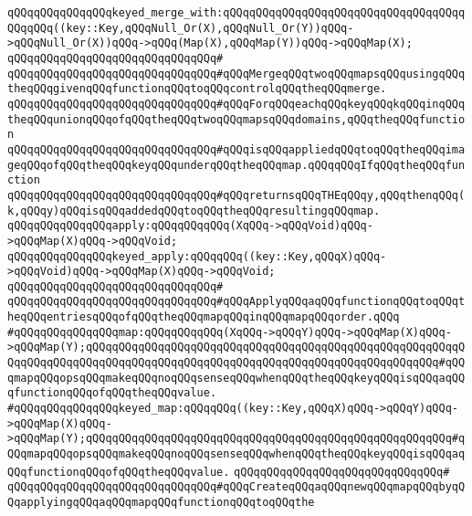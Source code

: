 \verb|qQQqqQQqqQQqqQQqkeyed_merge_with:qQQqqQQqqQQqqQQqqQQqqQQqqQQqqQQqqQQqqQQqqQQq((key::Key,qQQqNull_Or(X),qQQqNull_Or(Y))qQQq->qQQqNull_Or(X))qQQq->qQQq(Map(X),qQQqMap(Y))qQQq->qQQqMap(X);|\newline
\verb|qQQqqQQqqQQqqQQqqQQqqQQqqQQqqQQq#|\newline
\verb|qQQqqQQqqQQqqQQqqQQqqQQqqQQqqQQq#qQQqMergeqQQqtwoqQQqmapsqQQqusingqQQqtheqQQqgivenqQQqfunctionqQQqtoqQQqcontrolqQQqtheqQQqmerge.|\newline
\verb|qQQqqQQqqQQqqQQqqQQqqQQqqQQqqQQq#qQQqForqQQqeachqQQqkeyqQQqkqQQqinqQQqtheqQQqunionqQQqofqQQqtheqQQqtwoqQQqmapsqQQqdomains,qQQqtheqQQqfunction|\newline
\verb|qQQqqQQqqQQqqQQqqQQqqQQqqQQqqQQq#qQQqisqQQqappliedqQQqtoqQQqtheqQQqimageqQQqofqQQqtheqQQqkeyqQQqunderqQQqtheqQQqmap.qQQqqQQqIfqQQqtheqQQqfunction|\newline
\verb|qQQqqQQqqQQqqQQqqQQqqQQqqQQqqQQq#qQQqreturnsqQQqTHEqQQqy,qQQqthenqQQq(k,qQQqy)qQQqisqQQqaddedqQQqtoqQQqtheqQQqresultingqQQqmap.|\newline
\newline
\verb|qQQqqQQqqQQqqQQqapply:qQQqqQQqqQQq(XqQQq->qQQqVoid)qQQq->qQQqMap(X)qQQq->qQQqVoid;|\newline
\verb|qQQqqQQqqQQqqQQqkeyed_apply:qQQqqQQq((key::Key,qQQqX)qQQq->qQQqVoid)qQQq->qQQqMap(X)qQQq->qQQqVoid;|\newline
\verb|qQQqqQQqqQQqqQQqqQQqqQQqqQQqqQQq#|\newline
\verb|qQQqqQQqqQQqqQQqqQQqqQQqqQQqqQQq#qQQqApplyqQQqaqQQqfunctionqQQqtoqQQqtheqQQqentriesqQQqofqQQqtheqQQqmapqQQqinqQQqmapqQQqorder.qQQq|\newline
\newline
\verb|#qQQqqQQqqQQqqQQqmap:qQQqqQQqqQQq(XqQQq->qQQqY)qQQq->qQQqMap(X)qQQq->qQQqMap(Y);qQQqqQQqqQQqqQQqqQQqqQQqqQQqqQQqqQQqqQQqqQQqqQQqqQQqqQQqqQQqqQQqqQQqqQQqqQQqqQQqqQQqqQQqqQQqqQQqqQQqqQQqqQQqqQQqqQQqqQQqqQQq#qQQqmapqQQqopsqQQqmakeqQQqnoqQQqsenseqQQqwhenqQQqtheqQQqkeyqQQqisqQQqaqQQqfunctionqQQqofqQQqtheqQQqvalue.|\newline
\verb|#qQQqqQQqqQQqqQQqkeyed_map:qQQqqQQq((key::Key,qQQqX)qQQq->qQQqY)qQQq->qQQqMap(X)qQQq->qQQqMap(Y);qQQqqQQqqQQqqQQqqQQqqQQqqQQqqQQqqQQqqQQqqQQqqQQqqQQqqQQq#qQQqmapqQQqopsqQQqmakeqQQqnoqQQqsenseqQQqwhenqQQqtheqQQqkeyqQQqisqQQqaqQQqfunctionqQQqofqQQqtheqQQqvalue.|\newline
\verb|qQQqqQQqqQQqqQQqqQQqqQQqqQQqqQQq#|\newline
\verb|qQQqqQQqqQQqqQQqqQQqqQQqqQQqqQQq#qQQqCreateqQQqaqQQqnewqQQqmapqQQqbyqQQqapplyingqQQqaqQQqmapqQQqfunctionqQQqtoqQQqthe|\newline
